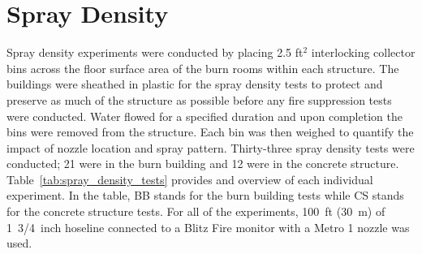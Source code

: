 \documentclass[12pt,oneside]{book}
\begin{document}
\section{Spray Density}
\label{sec:Spray_Density}

Spray density experiments were conducted by placing 2.5 ft$^2$ interlocking collector bins across the floor surface area of the burn rooms within each structure. The buildings were sheathed in plastic for the spray density tests to protect and preserve as much of the structure as possible before any fire suppression tests were conducted. Water flowed for a specified duration and upon completion the bins were removed from the structure. Each bin was then weighed to quantify the impact of nozzle location and spray pattern. Thirty-three spray density tests were conducted; 21 were in the burn building and 12 were in the concrete structure. Table~\ref{tab:spray_density_tests} provides and overview of each individual experiment. In the table, BB stands for the burn building tests while CS stands for the concrete structure tests. For all of the experiments, 100~ft (30~m) of 1~3/4~inch hoseline connected to a Blitz Fire monitor with a Metro 1 nozzle was used.
\end{document}
